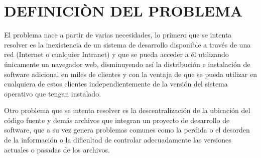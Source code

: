 \section{DEFINICIÒN DEL PROBLEMA}

El problema nace a partir de varias necesidades, lo primero que se intenta resolver es la inexistencia de un sistema de desarrollo disponible a través de una red (Internet o cualquier Intranet) y que se pueda acceder a él utilizando únicamente un navegador web, disminuyendo así la distribución e instalación de software adicional en miles de clientes y con la ventaja de que se pueda utilizar en cualquiera de estos clientes independientemente de la versión del sistema operativo que tengan instalado.

Otro problema que se intenta resolver es la descentralización de la ubicación del código fuente y demás archivos que integran un proyecto de desarrollo de software, que a su vez genera problemas comunes como la perdida o el desorden de la información o la dificultad de controlar adecuadamente las versiones actuales o pasadas de los archivos.
